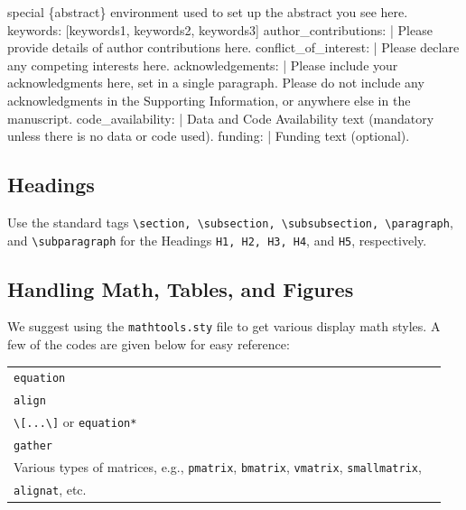 \documentclass[]{imag-ms-template}
\newenvironment{Shaded}{\begin{snugshade}}{\end{snugshade}}
\newcommand{\AttributeTok}[1]{\textcolor[rgb]{0.40,0.45,0.13}{#1}}
\newcommand{\CharTok}[1]{\textcolor[rgb]{0.13,0.47,0.30}{#1}}
\newcommand{\FunctionTok}[1]{\textcolor[rgb]{0.28,0.35,0.67}{#1}}
\newcommand{\KeywordTok}[1]{\textcolor[rgb]{0.00,0.23,0.31}{#1}}
\newcommand{\NormalTok}[1]{\textcolor[rgb]{0.00,0.23,0.31}{#1}}
\theoremstyle{plain}
\theoremstyle{remark}
\begin{document}
\begin{Shaded}
\begin{Highlighting}[]
\NormalTok{  special \textasciigrave{}\{abstract\}\textasciigrave{} environment used to set up the}
\NormalTok{  abstract you see here.}
\FunctionTok{keywords}\KeywordTok{:}\AttributeTok{ }\KeywordTok{[}\AttributeTok{keywords1}\KeywordTok{,}\AttributeTok{ keywords2}\KeywordTok{,}\AttributeTok{ keywords3}\KeywordTok{]}
\FunctionTok{author\_contributions}\KeywordTok{: }\CharTok{|}
\NormalTok{  Please provide details of author contributions here.}
\FunctionTok{conflict\_of\_interest}\KeywordTok{: }\CharTok{|}
\NormalTok{  Please declare any competing interests here.}
\FunctionTok{acknowledgements}\KeywordTok{: }\CharTok{|}
\NormalTok{  Please include your acknowledgments here, set in a single paragraph. Please do not}
\NormalTok{  include any acknowledgments in the Supporting Information, or anywhere else in the}
\NormalTok{  manuscript.}
\FunctionTok{code\_availability}\KeywordTok{: }\CharTok{|}
\NormalTok{  Data and Code Availability text (mandatory unless there is no data or code used).}
\FunctionTok{funding}\KeywordTok{: }\CharTok{|}
\NormalTok{  Funding text (optional).}
\end{Highlighting}
\end{Shaded}

\subsection{Headings}\label{headings}

Use the standard tags
\texttt{\textbackslash{}section,\ \textbackslash{}subsection,\ \textbackslash{}subsubsection,\ \textbackslash{}paragraph},
and \texttt{\textbackslash{}subparagraph} for the Headings
\texttt{H1,\ H2,\ H3,\ H4}, and \texttt{H5}, respectively.

\subsection{Handling Math, Tables, and
Figures}\label{handling-math-tables-and-figures}

We suggest using the \texttt{mathtools.sty} file to get various display
math styles. A few of the codes are given below for easy reference:

\bigskip

\noindent

\begin{tabular}{@{}ll}
\toprule
\verb!equation!\\
\verb!align!\\
\verb!\[...\]! or \verb!equation*!\\
\verb!gather!\\
Various types of matrices, e.g., \verb!pmatrix!, \verb!bmatrix!,
\verb!vmatrix!, \verb!smallmatrix!,\\
\verb!alignat!, etc.\\
\bottomrule
\end{tabular}
\end{document}
